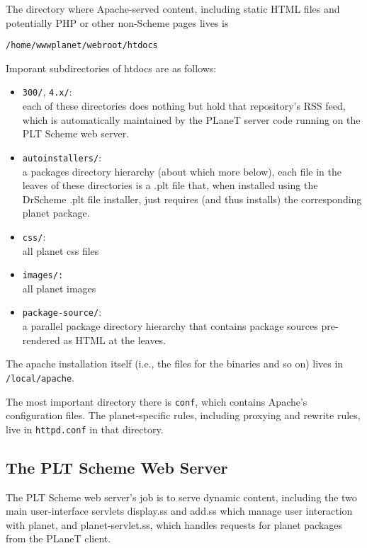 \documentclass{article}
\begin{document}
The directory where Apache-served content, including static HTML files
and potentially PHP or other non-Scheme pages lives is

  \texttt{/home/wwwplanet/webroot/htdocs}

Imporant subdirectories of htdocs are as follows:

\begin{itemize}
\item \texttt{300/}, \texttt{4.x/}:  \\
each of these directories does nothing but hold that repository's RSS
  feed, which is automatically maintained by the PLaneT server code
  running on the PLT Scheme web server.

\item \texttt{autoinstallers/}: \\
a packages directory hierarchy (about which more below), each file in
  the leaves of these directories is a .plt file that, when installed
  using the DrScheme .plt file installer, just requires (and thus
  installs) the corresponding planet package.
\item \texttt{css/}: \\
all planet css files
\item \texttt{images/:} \\
all planet images
\item \texttt{package-source/}: \\
a parallel package directory hierarchy that contains package sources
pre-rendered as HTML at the leaves.
\end{itemize}

The apache installation itself (i.e., the files for the binaries and
so on) lives in \texttt{/local/apache}.

The most important directory there is \texttt{conf}, which contains
Apache's configuration files. The planet-specific rules, including
proxying and rewrite rules, live in
   \texttt{httpd.conf}
in that directory.

\subsection{The PLT Scheme Web Server}

The PLT Scheme web server's job is to serve dynamic content, including
the two main user-interface servlets display.ss and add.ss which
manage user interaction with planet, and planet-servlet.ss, which
handles requests for planet packages from the PLaneT client.
\end{document}
